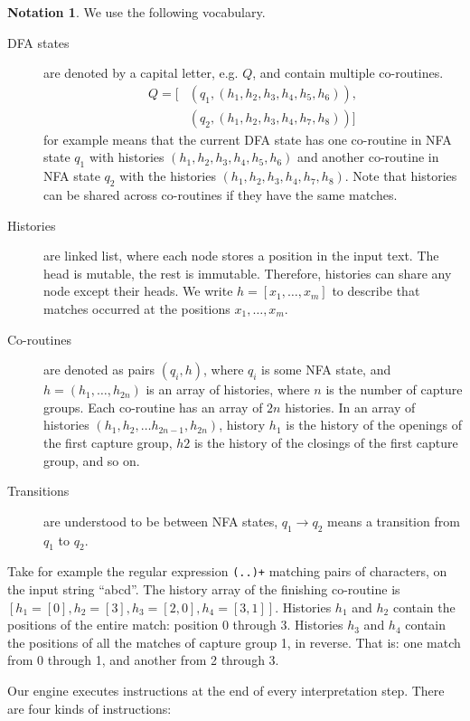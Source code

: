 \documentclass[11pt,a4paper,twoside,openright]{Thesis}
\theoremstyle{definition}
\newtheorem*{notation}{Notation}
\begin{document}
\begin{notation}
We use the following vocabulary.

\begin{description}
\item[DFA states] are denoted by a capital letter, e.g. $Q$, and
	contain multiple co-routines.
  \begin{equation*}\begin{split}Q=[&(q_1, (h_1, h_2, h_3, h_4, h_5, h_6)),\\
	&(q_2, (h_1, h_2, h_3, h_4, h_7, h_8))]\end{split}\end{equation*} for example means
	that the current DFA state has one co-routine in NFA state $q_1$ with
	histories $(h_1, h_2, h_3, h_4, h_5, h_6)$ and another co-routine in NFA state
	$q_2$ with the histories $(h_1, h_2, h_3, h_4, h_7, h_8)$.
	Note that histories can be shared across co-routines if they
	have the same matches.
\item[Histories] are linked list, where each node stores a position in the
  input text.  The head is mutable, the rest is immutable. Therefore, histories
  can share any node except their heads. We write $h=[x_1, \dots, x_m]$ to
  describe that matches occurred at the positions $x_1, \dots, x_m$.
\item[Co-routines] are denoted as pairs $(q_i, h)$, where $q_i$ is some
	NFA state, and $h = (h_1, \dots, h_{2n})$ is an array of histories,
	where $n$ is the number of capture groups.  Each co-routine has an array
	of $2n$ histories. In an array of histories $(h_1, h_2, \dots
	h_{2n-1}, h_{2n})$, history $h_1$ is the history of the openings
	of the first capture group, $h2$ is the history of the closings of
	the first capture group, and so on.
\item[Transitions] are  understood to be between NFA states,
	$q_1\rightarrow q_2$ means a transition from $q_1$ to $q_2$.
\end{description}

Take for example the regular expression \texttt{(..)+} matching
pairs of characters, on the input string ``abcd''. The history array of the
finishing co-routine  is $[h_1=[0], h_2=[3], h_3=[2,0], h_4=[3,1]]$.
Histories $h_1$ and $h_2$ contain the positions of the entire match: position 0
through 3.  Histories $h_3$ and $h_4$ contain the positions of all the matches of
capture group 1, in reverse. That is: one match from 0 through 1, and another from
2 through 3.

Our engine executes instructions at the end of every interpretation
step. There are four kinds of instructions:


\end{notation}
\end{document}
